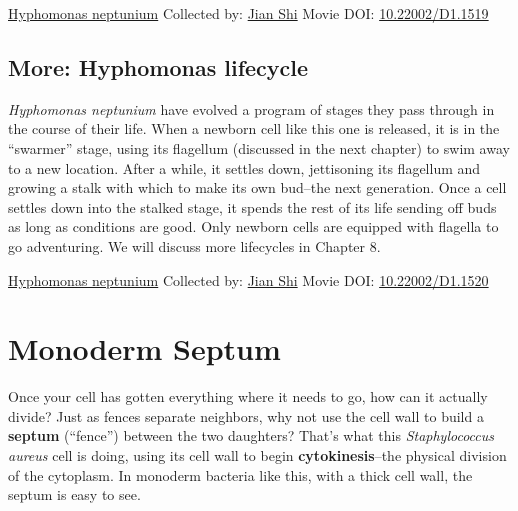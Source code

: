 \documentclass[]{tufte-book}
\begin{document}
\hypertarget{htmlwidget-9c4c5ed0daab00baa933}{}

\label{fig:5-3a}\protect\hyperlink{tree}{Hyphomonas neptunium} Collected by: \protect\hyperlink{jian_shi}{Jian Shi} Movie DOI: \href{https://doi.org/10.22002/D1.1519}{10.22002/D1.1519}

\hypertarget{Hyphomonas_lifecycle}{%
\subsection*{More: Hyphomonas lifecycle}\label{Hyphomonas_lifecycle}}

\emph{Hyphomonas neptunium} have evolved a program of stages they pass through in the course of their life. When a newborn cell like this one is released, it is in the ``swarmer'' stage, using its flagellum (discussed in the next chapter) to swim away to a new location. After a while, it settles down, jettisoning its flagellum and growing a stalk with which to make its own bud--the next generation. Once a cell settles down into the stalked stage, it spends the rest of its life sending off buds as long as conditions are good. Only newborn cells are equipped with flagella to go adventuring. We will discuss more lifecycles in Chapter 8.



\hypertarget{htmlwidget-d4a55598b121eed12ebc}{}

\label{fig:5-3b}\protect\hyperlink{tree}{Hyphomonas neptunium} Collected by: \protect\hyperlink{jian_shi}{Jian Shi} Movie DOI: \href{https://doi.org/10.22002/D1.1520}{10.22002/D1.1520}

\hypertarget{monoderm-septum}{%
\section{Monoderm Septum}\label{monoderm-septum}}

Once your cell has gotten everything where it needs to go, how can it actually divide? Just as fences separate neighbors, why not use the cell wall to build a \textbf{septum} (``fence'') between the two daughters? That's what this \emph{Staphylococcus aureus} cell is doing, using its cell wall to begin \textbf{cytokinesis}--the physical division of the cytoplasm. In monoderm bacteria like this, with a thick cell wall, the septum is easy to see.



\hypertarget{htmlwidget-9d3c7e3ebad94c6b331c}{}
\end{document}
